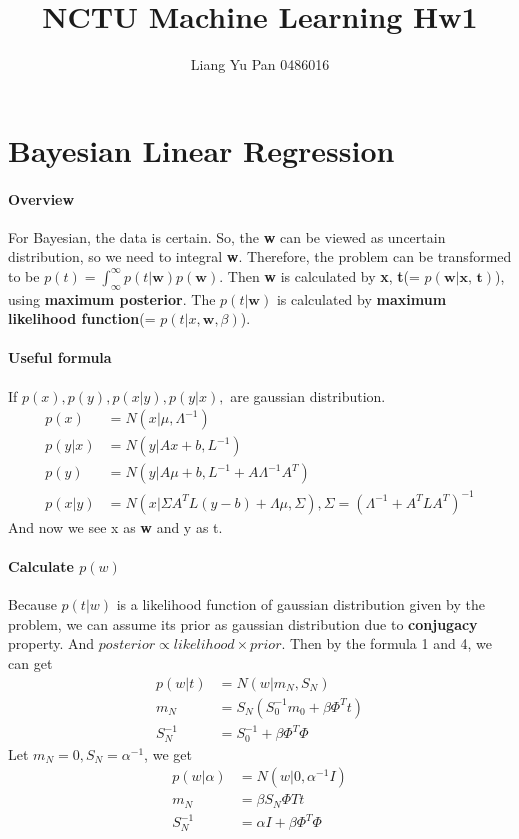 \documentclass[]{article}
\title{NCTU Machine Learning Hw1}
\author{Liang Yu Pan 0486016}
\begin{document}
	
	\maketitle
	
	
	\section{Bayesian Linear Regression}
	\paragraph{Overview}
	For Bayesian, the data is certain. So, the \textbf{w} can be viewed as uncertain distribution, so we need to integral \textbf{w}. Therefore, the problem can be transformed to be $ p(t) = \int_{\infty}^{\infty}p(t | \textbf{w}) p(\textbf{w})$. Then \textbf{w} is calculated by \textbf{x}, \textbf{t}(= $p(\textbf{w}|\textbf{x, t})$), using \textbf{maximum posterior}.  The $p(t|\textbf{w})$ is calculated by \textbf{maximum likelihood function}(= $p(t|x, \textbf{w}, \beta)$).
	\paragraph{Useful formula}
	If $p(x), p(y), p(x|y), p(y|x), $ are gaussian distribution.
	\begin{align}
	p(x) &= N(x|\mu, \Lambda^{-1})\\
	p(y|x) &= N(y|Ax+b, L^{-1})\\
	p(y) &= N(y|A\mu+b, L^{-1}+A\Lambda^{-1}A^{T})\\
	p(x|y) &= N(x|\Sigma{A^{T}L(y-b) + \Lambda\mu}, \Sigma), \Sigma = (\Lambda^{-1} + A^{T}LA^{T})^{-1}
	\end{align}
	And now we see x as \textbf{w} and y as t.
	\paragraph{Calculate $ p(w) $}
	Because $p(t|w)$ is a likelihood function of gaussian distribution given by the problem, we can assume its prior as gaussian distribution due to \textbf{conjugacy} property. And $ posterior \propto likelihood \times prior$. Then by the formula 1 and 4, we can get 
	\begin{align*}
	p(w|t) &= N(w|m_{N}, S_{N})\\
	m_{N} &= S_{N}(S_{0}^{-1}m_{0}+\beta\Phi^{T}t)\\
	S_{N}^{-1} &= S_{0}^{-1}+\beta\Phi^{T}\Phi
	\end{align*}    
	Let $m_{N} = 0, S_{N} = \alpha^{-1}$, we get
	\begin{align*}
	p(w|\alpha) &= N(w|0, \alpha^{-1}I)\\
	m_{N} &= \beta S_{N}\Phi{T}t\\
	S_{N}^{-1} &= \alpha I + \beta\Phi^{T}\Phi
	\end{align*}    
\end{document}

